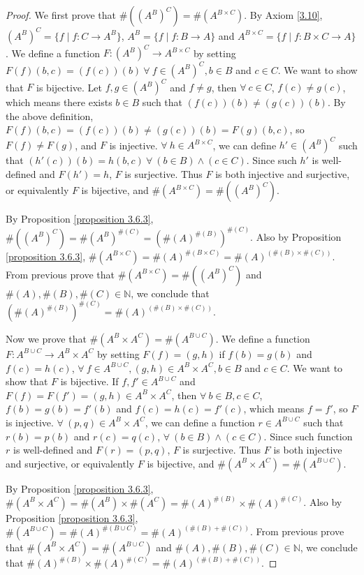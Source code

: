 \begin{proof}
We first prove that \(\#((A^B)^C) = \#(A^{B \times C})\).
By Axiom \ref{3.10}, \((A^B)^C = \{f \mid f : C \to A^B\}\), \(A^B = \{f \mid f : B \to A\}\) and \(A^{B \times C} = \{f \mid f : B \times C \to A\}\).
We define a function \(F : (A^B)^C \to A^{B \times C}\) by setting \(F(f)(b, c) = (f(c))(b) \ \forall\ f \in (A^B)^C, b \in B\) and \(c \in C\).
We want to show that \(F\) is bijective.
Let \(f, g \in (A^B)^C\) and \(f \neq g\), then \(\forall\ c \in C\), \(f(c) \neq g(c)\), which means there exists \(b \in B\) such that \((f(c))(b) \neq (g(c))(b)\).
By the above definition, \(F(f)(b, c) = (f(c))(b) \neq (g(c))(b) = F(g)(b, c)\), so \(F(f) \neq F(g)\), and \(F\) is injective.
\(\forall\ h \in A^{B \times C}\), we can define \(h' \in (A^B)^C\) such that \((h'(c))(b) = h(b, c) \ \forall\ (b \in B) \land (c \in C)\).
Since such \(h'\) is well-defined and \(F(h') = h\), \(F\) is surjective.
Thus \(F\) is both injective and surjective, or equivalently \(F\) is bijective, and \(\#(A^{B \times C}) = \#((A^B)^C)\).

By Proposition \ref{proposition 3.6.3}, \(\#((A^B)^C) = \#(A^B)^{\#(C)} = (\#(A)^{\#(B)})^{\#(C)}\).
Also by Proposition \ref{proposition 3.6.3}, \(\#(A^{B \times C}) = \#(A)^{\#(B \times C)} = \#(A)^{(\#(B) \times \#(C))}\).
From previous prove that \(\#(A^{B \times C}) = \#((A^B)^C)\) and \(\#(A), \#(B), \#(C) \in \mathds{N}\), we conclude that \((\#(A)^{\#(B)})^{\#(C)} = \#(A)^{(\#(B) \times \#(C))}\).

Now we prove that \(\#(A^B \times A^C) = \#(A^{B \cup C})\).
We define a function \(F : A^{B \cup C} \to A^B \times A^C\) by setting \(F(f) = (g, h)\) if \(f(b) = g(b)\) and \(f(c) = h(c)\), \(\forall\ f \in A^{B \cup C}, (g, h) \in A^B \times A^C, b \in B\) and \(c \in C\).
We want to show that \(F\) is bijective.
If \(f, f' \in A^{B \cup C}\) and \(F(f) = F(f') = (g, h) \in A^B \times A^C\), then \(\forall\ b \in B, c \in C\), \(f(b) = g(b) = f'(b)\) and \(f(c) = h(c) = f'(c)\), which means \(f = f'\), so \(F\) is injective.
\(\forall\ (p, q) \in A^B \times A^C\), we can define a function \(r \in A^{B \cup C}\) such that \(r(b) = p(b)\) and \(r(c) = q(c)\), \(\forall\ (b \in B) \land (c \in C)\).
Since such function \(r\) is well-defined and \(F(r) = (p, q)\), \(F\) is surjective.
Thus \(F\) is both injective and surjective, or equivalently \(F\) is bijective, and \(\#(A^B \times A^C) = \#(A^{B \cup C})\).

By Proposition \ref{proposition 3.6.3}, \(\#(A^B \times A^C) = \#(A^B) \times \#(A^C) = \#(A)^{\#(B)} \times \#(A)^{\#(C)}\).
Also by Proposition \ref{proposition 3.6.3}, \(\#(A^{B \cup C}) = \#(A)^{\#(B \cup C)} = \#(A)^{(\#(B) + \#(C))}\).
From previous prove that \(\#(A^B \times A^C) = \#(A^{B \cup C})\) and \(\#(A), \#(B), \#(C) \in \mathds{N}\), we conclude that \(\#(A)^{\#(B)} \times \#(A)^{\#(C)} = \#(A)^{(\#(B) + \#(C))}\).
\end{proof}

